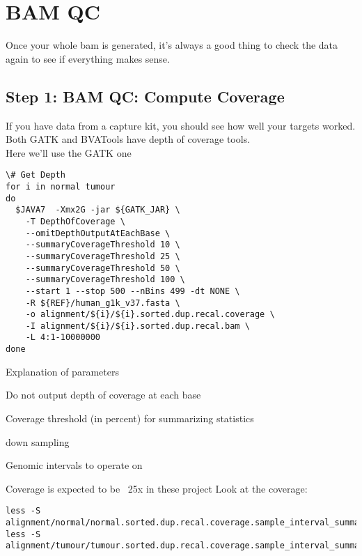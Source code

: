 \section{BAM QC}

Once your whole bam is generated, it's always a good thing to check the data again to see if everything makes sense.

\subsection{Step 1: BAM QC: Compute Coverage}
If you have data from a capture kit, you should see how well your targets worked. Both GATK and BVATools have depth of coverage tools. \\
Here we'll use the GATK one
\begin{lstlisting}
\# Get Depth
for i in normal tumour
do
  $JAVA7  -Xmx2G -jar ${GATK_JAR} \
    -T DepthOfCoverage \
    --omitDepthOutputAtEachBase \
    --summaryCoverageThreshold 10 \
    --summaryCoverageThreshold 25 \
    --summaryCoverageThreshold 50 \
    --summaryCoverageThreshold 100 \
    --start 1 --stop 500 --nBins 499 -dt NONE \
    -R ${REF}/human_g1k_v37.fasta \
    -o alignment/${i}/${i}.sorted.dup.recal.coverage \
    -I alignment/${i}/${i}.sorted.dup.recal.bam \
    -L 4:1-10000000
done
\end{lstlisting}

\begin{note}
Explanation of parameters
\begin{description}[style=multiline,labelindent=0cm,align=right,leftmargin=\descriptionlabelspace,rightmargin=1.5cm,font=\ttfamily]
 \item[omitBaseOutput] Do not output depth of coverage at each base
 \item[summaryCoverageThreshol] Coverage threshold (in percent) for summarizing statistics
 \item[dt] down sampling
 \item[L] Genomic intervals to operate on
\end{description}
\end{note}

Coverage is expected to be ~25x in these project
Look at the coverage:

\begin{lstlisting}
less -S alignment/normal/normal.sorted.dup.recal.coverage.sample_interval_summary
less -S alignment/tumour/tumour.sorted.dup.recal.coverage.sample_interval_summary
\end{lstlisting}

